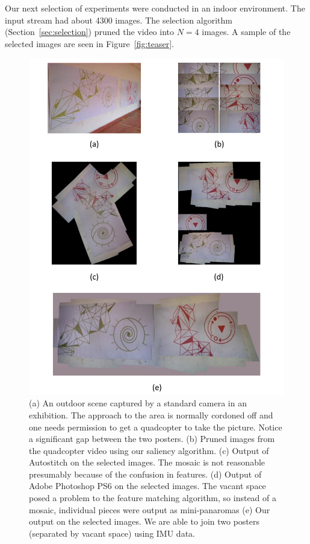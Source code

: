 Our next selection of experiments were conducted in an indoor
environment.  The input stream had about 4300
images. The selection algorithm (Section~\ref{sec:selection}) pruned the video
into $N=4$ images.
A sample of the selected images are seen in Figure~\ref{fig:teaser}.

\begin{figure}[h!]
\centering
\includegraphics[width=0.86\linewidth]{figures/results}
\caption{(a) An outdoor scene captured by a standard camera in an
  exhibition. The approach to the area is normally cordoned off and one
  needs permission to get a quadcopter to take the picture.  Notice a
  significant gap between the two posters.  (b) Pruned images from the
  quadcopter video using our saliency algorithm. (c) Output of
  Autostitch on the selected images. The mosaic is not reasonable
  presumably because of the confusion in features. (d) Output of Adobe
  Photoshop PS6 on the selected images. The vacant space posed a
  problem to the feature matching algorithm, so instead of a mosaic,
  individual pieces were output as mini-panaromas (e) Our output on
  the selected images. We are able to join two posters (separated by
  vacant space) using IMU data.}
\label{fig:results}
\end{figure}

